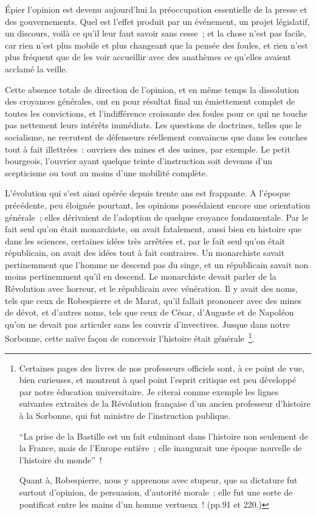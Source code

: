\documentclass[french,twoside]{book} %
\begin{document}
Épier l’opinion est devenu aujourd’hui la préoccupation essentielle de la presse et des gouvernements. Quel est l’effet produit par un événement, un projet législatif, un discours, voilà ce qu’il leur faut savoir sans cesse ; et la chose n’est pas facile, car rien n’est plus mobile et plus changeant que la pensée des foules, et rien n’est plus fréquent que de les voir accueillir avec des anathèmes ce qu’elles avaient acclamé la veille.\par
Cette absence totale de direction de l’opinion, et en même temps la dissolution des croyances générales, ont en pour résultat final un émiettement complet de toutes les convictions, et l’indifférence croissante des foules pour ce qui ne touche pas nette­ment leurs intérêts immédiats. Les questions de doctrines, telles que le socialisme, ne recrutent de défenseurs réellement convaincus que dans les couches tout à fait illettrées : ouvriers des mines et des usines, par exemple. Le petit bourgeois, l’ouvrier ayant quelque teinte d’instruction soit devenus d’un scepticisme ou tout au moins d’une mobilité complète.\par
L’évolution qui s’est ainsi opérée depuis trente ans est frappante. A l’époque précé­dente, peu éloignée pourtant, les opinions possédaient encore une orientation géné­rale ; elles dérivaient de l’adoption de quelque croyance fondamentale. Par le fait seul qu’on était monarchiste, on avait fatalement, aussi bien en histoire que dans les sciences, certaines idées très arrêtées et, par le fait seul qu’on était républicain, on avait des idées tout à fait contraires. Un monarchiste savait pertinemment que l’hom­me ne descend pas du singe, et un républicain savait non moins pertinemment qu’il en descend. Le monarchiste devait parler de la Révolution avec horreur, et le républicain avec vénération. Il y avait des noms, tels que ceux de Robespierre et de Marat, qu’il fallait prononcer avec des mines de dévot, et d’autres noms, tels que ceux de César, d’Auguste et de Napoléon qu’on ne devait pas articuler sans les couvrir d’invectives. Jusque dans notre Sorbonne, cette naïve façon de concevoir l’histoire était générale \footnote{ \noindent Certaines pages des livres de nos professeurs officiels sont, à ce point de vue, bien curieuses, et montrent à quel point l’esprit critique est peu développé par notre éducation universitaire. Je citerai comme exemple les lignes suivantes extraites de la Révolution française d’un ancien professeur d’histoire à la Sorbonne, qui fut ministre de l’instruction publique.\par
 “La prise de la Bastille est un fait culminant dans l’histoire non seulement de la France, mais de l’Europe entière ; elle inaugurait une époque nouvelle de l’histoire du monde” !\par
 Quant à, Robespierre, nous y apprenons avec stupeur, que sa dictature fut surtout d’opinion, de persuasion, d’autorité morale ; elle fut une sorte de pontificat entre les mains d’un homme vertueux ! (pp.91 et 220.)
}.\par
\end{document}
